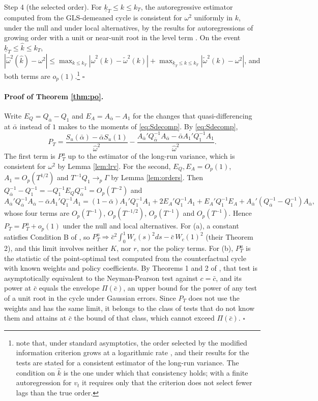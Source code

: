 \documentclass[12pt,a4paper]{article}
\theoremstyle{definition}
\theoremstyle{definition}\newtheorem{example}{Example}
\theoremstyle{definition}\newtheorem{definition}{Definition}
\begin{document}
Step 4 (the selected order). For $\underline k_T\leq k\leq k_T$, the autoregressive estimator computed from the GLS-demeaned cycle is consistent for $\omega^2$ uniformly in $k$, under the null and under local alternatives, by the results for autoregressions of growing order with a unit or near-unit root in the level term \citep{Berk1974,SaidDickey1984,PerronNg1998}. On the event $\underline k_T\leq\hat k\leq k_T$, $|\hat\omega^2(\hat k)-\omega^2|\leq\max_{k\leq k_T}|\hat\omega^2(k)-\tilde\omega^2(k)|+\max_{\underline k_T\leq k\leq k_T}|\tilde\omega^2(k)-\omega^2|$, and both terms are $o_p(1)$.\footnote{\citet[Section 6.2]{NgPerron2001} note that, under standard asymptotics, the order selected by the modified information criterion grows at a logarithmic rate \citep{HannanDeistler1988}, and their results for the tests are stated for a consistent estimator of the long-run variance. The condition on $\hat k$ is the one under which that consistency holds; with a finite autoregression for $v_t$ it requires only that the criterion does not select fewer lags than the true order.} $\square$

\paragraph{Proof of Theorem \ref{thm:po}.} Write $E_Q=Q_{\bar\alpha}-Q_1$ and $E_A=A_{\bar\alpha}-A_1$ for the changes that quasi-differencing at $\bar\alpha$ instead of $1$ makes to the moments of \eqref{eq:Sdecomp}. By \eqref{eq:Sdecomp},
\[
P_T=\frac{S_u(\bar\alpha)-\bar\alpha S_u(1)}{\hat\omega^2}-\frac{A_{\bar\alpha}'Q_{\bar\alpha}^{-1}A_{\bar\alpha}-\bar\alpha A_1'Q_1^{-1}A_1}{\hat\omega^2}.
\]
The first term is $P^u_T$ up to the estimator of the long-run variance, which is consistent for $\omega^2$ by Lemma \ref{lem:lrv}. For the second, $E_Q,E_A=O_p(1)$, $A_1=O_p(T^{1/2})$ and $T^{-1}Q_1\to_p\Gamma$ by Lemma \ref{lem:orders}. Then $Q_{\bar\alpha}^{-1}-Q_1^{-1}=-Q_1^{-1}E_QQ_{\bar\alpha}^{-1}=O_p(T^{-2})$ and
\[
A_{\bar\alpha}'Q_{\bar\alpha}^{-1}A_{\bar\alpha}-\bar\alpha A_1'Q_1^{-1}A_1=(1-\bar\alpha)A_1'Q_1^{-1}A_1+2E_A'Q_1^{-1}A_1+E_A'Q_1^{-1}E_A+A_{\bar\alpha}'(Q_{\bar\alpha}^{-1}-Q_1^{-1})A_{\bar\alpha},
\]
whose four terms are $O_p(T^{-1})$, $O_p(T^{-1/2})$, $O_p(T^{-1})$ and $O_p(T^{-1})$. Hence $P_T=P^u_T+o_p(1)$ under the null and local alternatives. For (a), a constant satisfies Condition B of \citet{ERS1996}, so $P^u_T\Rightarrow\bar c^2\int_0^1W_c(s)^2ds-\bar c\,W_c(1)^2$ (their Theorem 2), and this limit involves neither $K$, nor $r$, nor the policy terms. For (b), $P^u_T$ is the statistic of the point-optimal test computed from the counterfactual cycle with known weights and policy coefficients. By Theorems 1 and 2 of \citet{ERS1996}, that test is asymptotically equivalent to the Neyman-Pearson test against $c=\bar c$, and its power at $\bar c$ equals the envelope $\Pi(\bar c)$, an upper bound for the power of any test of a unit root in the cycle under Gaussian errors. Since $P_T$ does not use the weights and has the same limit, it belongs to the class of tests that do not know them and attains at $\bar c$ the bound of that class, which cannot exceed $\Pi(\bar c)$. $\square$
\end{document}
